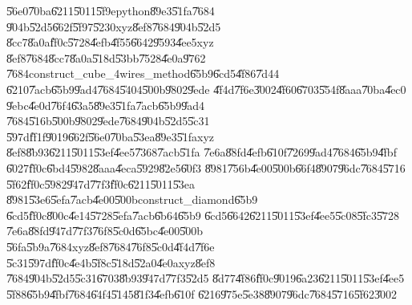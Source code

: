 \bigskip

\U{56e0}\U{70ba}\U{6211}\U{5011}\U{5f9e}python\U{89e3}\U{51fa}\U{7684}%
\U{904b}\U{52d5}\U{662f}\U{5f97}\U{5230}xyz\U{8ef8}\U{7684}\U{904b}\U{52d5}%
\U{8cc7}\U{8a0a}\U{ff0c}\U{5728}\U{4efb}\U{4f55}\U{6642}\U{9593}\U{4ee5}xyz%
\U{8ef8}\U{7684}\U{8cc7}\U{8a0a}\U{518d}\U{53bb}\U{7528}\U{4e0a}\U{9762}%
\U{7684}construct\_cube\_4wires\_method\U{65b9}\U{6cd5}\U{4f86}\U{7d44}%
\U{6210}\U{7acb}\U{65b9}\U{9ad4}\U{7684}\U{5404}\U{500b}\U{9802}\U{9ede}%
\U{4f4d}\U{7f6e}\U{3002}\U{4f60}\U{6703}\U{554f}\U{8aaa}\U{70ba}\U{4ec0}%
\U{9ebc}\U{4e0d}\U{76f4}\U{63a5}\U{89e3}\U{51fa}\U{7acb}\U{65b9}\U{9ad4}%
\U{7684}\U{516b}\U{500b}\U{9802}\U{9ede}\U{7684}\U{904b}\U{52d5}\U{5c31}%
\U{597d}\U{ff1f}\U{9019}\U{662f}\U{56e0}\U{70ba}\U{53ea}\U{89e3}\U{51fa}xyz%
\U{8ef8}\U{8b93}\U{6211}\U{5011}\U{53ef}\U{4ee5}\U{7368}\U{7acb}\U{51fa}%
\U{7e6a}\U{88fd}\U{4efb}\U{610f}\U{7269}\U{9ad4}\U{7684}\U{65b9}\U{4fbf}%
\U{6027}\U{ff0c}\U{6bd4}\U{5982}\U{8aaa}\U{4eca}\U{5929}\U{82e5}\U{60f3}%
\U{8981}\U{756b}\U{4e00}\U{500b}\U{66f4}\U{8907}\U{96dc}\U{7684}\U{5716}%
\U{5f62}\U{ff0c}\U{5982}\U{947d}\U{77f3}\U{ff0c}\U{6211}\U{5011}\U{53ea}%
\U{8981}\U{53e6}\U{5efa}\U{7acb}\U{4e00}\U{500b}construct\_diamond\U{65b9}%
\U{6cd5}\U{ff0c}\U{800c}\U{4e14}\U{5728}\U{5efa}\U{7acb}\U{6b64}\U{65b9}%
\U{6cd5}\U{6642}\U{6211}\U{5011}\U{53ef}\U{4ee5}\U{5c08}\U{5fc3}\U{5728}%
\U{7e6a}\U{88fd}\U{947d}\U{77f3}\U{76f8}\U{5c0d}\U{65bc}\U{4e00}\U{500b}%
\U{56fa}\U{5b9a}\U{7684}xyz\U{8ef8}\U{7684}\U{76f8}\U{5c0d}\U{4f4d}\U{7f6e}%
\U{5c31}\U{597d}\U{ff0c}\U{4e4b}\U{5f8c}\U{518d}\U{52a0}\U{4e0a}xyz\U{8ef8}%
\U{7684}\U{904b}\U{52d5}\U{5c31}\U{6703}\U{8b93}\U{947d}\U{77f3}\U{52d5}%
\U{8d77}\U{4f86}\U{ff0c}\U{9019}\U{6a23}\U{6211}\U{5011}\U{53ef}\U{4ee5}%
\U{5f88}\U{65b9}\U{4fbf}\U{7684}\U{64f4}\U{5145}\U{81f3}\U{4efb}\U{610f}%
\U{6216}\U{975e}\U{5e38}\U{8907}\U{96dc}\U{7684}\U{5716}\U{5f62}\U{3002}

